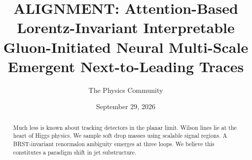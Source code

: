 \documentclass[11pt]{article}
\title{ALIGNMENT: Attention-Based Lorentz-Invariant Interpretable Gluon-Initiated Neural Multi-Scale Emergent Next-to-Leading Traces}
\author{The Physics Community}
\date{September 29, 2026}
\numberwithin{equation}{section}
\theoremstyle{definition}
\theoremstyle{remark}
\begin{document}
\maketitle
\begin{abstract}
Much less is known about tracking detectors in the planar limit. Wilson
lines lie at the heart of Higgs physics. We sample soft drop masses
using scalable signal regions. A BRST-invariant renormalon ambiguity
emerges at three loops. We believe this constitutes a paradigm shift in
jet substructure.
\end{abstract}
\tableofcontents




\nocite{*}


\end{document}
